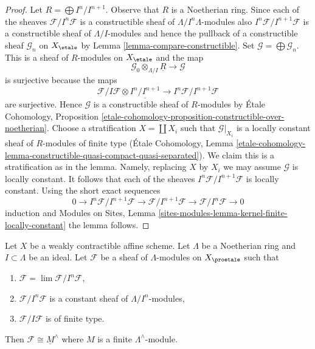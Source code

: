 \begin{proof}
Let $R = \bigoplus I^n/I^{n + 1}$. Observe that $R$ is a Noetherian ring.
Since each of the sheaves
$\mathcal{F}/I^n\mathcal{F}$ is a constructible sheaf of
$\Lambda/I^n\Lambda$-modules also $I^n\mathcal{F}/I^{n + 1}\mathcal{F}$
is a constructible sheaf of $\Lambda/I$-modules and hence the pullback
of a constructible sheaf $\mathcal{G}_n$ on $X_\etale$ by
Lemma \ref{lemma-compare-constructible}.
Set $\mathcal{G} = \bigoplus \mathcal{G}_n$. This is a sheaf
of $R$-modules on $X_\etale$ and the map
$$
\mathcal{G}_0 \otimes_{\Lambda/I} \underline{R}
\longrightarrow
\mathcal{G}
$$
is surjective because the maps
$$
\mathcal{F}/I\mathcal{F} \otimes \underline{I^n/I^{n + 1}} \to
I^n\mathcal{F}/I^{n + 1}\mathcal{F}
$$
are surjective. Hence $\mathcal{G}$ is a constructible sheaf of
$R$-modules by \'Etale Cohomology, Proposition
\ref{etale-cohomology-proposition-constructible-over-noetherian}.
Choose a stratification $X = \coprod X_i$ such that
$\mathcal{G}|_{X_i}$ is a locally constant sheaf of $R$-modules
of finite type (\'Etale Cohomology, Lemma
\ref{etale-cohomology-lemma-constructible-quasi-compact-quasi-separated}).
We claim this is a stratification as in the lemma.
Namely, replacing $X$ by $X_i$ we may assume $\mathcal{G}$ is locally
constant. It follows that each of the sheaves
 $I^n\mathcal{F}/I^{n + 1}\mathcal{F}$
is locally constant. Using the short exact sequences
$$
0 \to I^n\mathcal{F}/I^{n + 1}\mathcal{F} \to
\mathcal{F}/I^{n + 1}\mathcal{F} \to \mathcal{F}/I^n\mathcal{F} \to 0
$$
induction and Modules on Sites, Lemma
\ref{sites-modules-lemma-kernel-finite-locally-constant}
the lemma follows.
\end{proof}

\begin{lemma}
\label{lemma-weird}
Let $X$ be a weakly contractible affine scheme. Let $\Lambda$ be a Noetherian
ring and $I \subset \Lambda$ be an ideal. Let $\mathcal{F}$ be a sheaf of
$\Lambda$-modules on $X_\proetale$ such that
\begin{enumerate}
\item $\mathcal{F} = \lim \mathcal{F}/I^n\mathcal{F}$,
\item $\mathcal{F}/I^n\mathcal{F}$ is a constant sheaf of
$\Lambda/I^n$-modules,
\item $\mathcal{F}/I\mathcal{F}$ is of finite type.
\end{enumerate}
Then $\mathcal{F} \cong \underline{M}^\wedge$ where $M$ is
a finite $\Lambda^\wedge$-module.
\end{lemma}

